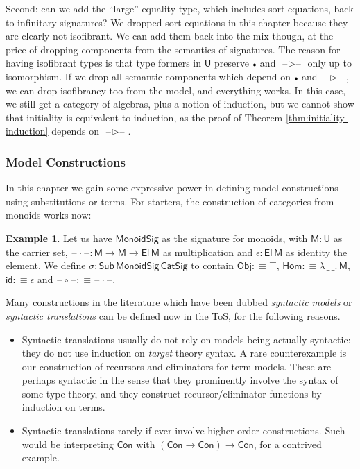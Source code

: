 \documentclass[12pt,a4paper,twoside,openany]{book}
\theoremstyle{remark}
\theoremstyle{definition}
\newtheorem{myexample}{Example}
\theoremstyle{theorem}
\newcommand{\ms}[1]{\mathsf{#1}}
\newcommand{\id}{\mathsf{id}}
\newcommand{\Con}{\mathsf{Con}}
\newcommand{\Sub}{\mathsf{Sub}}
\newcommand{\U}{\mathsf{U}}
\newcommand{\El}{\mathsf{El}}
\newcommand{\blank}{\mathord{\hspace{1pt}\text{--}\hspace{1pt}}}
\newcommand{\ext}{\triangleright}
\newcommand{\emptycon}{\scaleobj{.75}\bullet}
\newcommand{\defn}{:\equiv}
\begin{document}
Second: can we add the ``large'' equality type, which includes sort equations,
back to infinitary signatures? We dropped sort equations in this chapter because
they are clearly not isofibrant. We can add them back into the mix though, at
the price of dropping components from the semantics of signatures. The reason for
having isofibrant types is that type formers in $\U$ preserve $\emptycon$ and
$\blank\!\ext\!\blank$ only up to isomorphism. If we drop all semantic
components which depend on $\emptycon$ and $\blank\!\ext\!\blank$, we can drop
isofibrancy too from the model, and everything works. In this case, we still get
a category of algebras, plus a notion of induction, but we cannot show that
initiality is equivalent to induction, as the proof of Theorem
\ref{thm:initiality-induction} depends on $\blank\!\ext\!\blank$.

\subsubsection{Model Constructions}

In this chapter we gain some expressive power in defining model constructions
using substitutions or terms. For starters, the construction of categories from
monoids works now:

\begin{myexample}
Let us have
$\ms{MonoidSig}$ as the signature for monoids, with $\ms{M} : \U$ as the carrier
set, $\blank\!\cdot\!\blank : \ms{M} \to \ms{M} \to \El\,\ms{M}$ as
multiplication and $\epsilon : \El\,\ms{M}$ as identity the element. We define
$\sigma : \Sub\,\ms{MonoidSig}\,\ms{CatSig}$ to contain $\ms{Obj} \defn \top$,
$\ms{Hom} \defn \lambda\,\_\,\_.\,\ms{M}$, $\id \defn \epsilon$ and
$\blank\!\circ\!\blank \defn \blank\!\cdot\!\blank$.
\end{myexample}

Many constructions in the literature which have been dubbed \emph{syntactic
models} \cite{next700} or \emph{syntactic translations} can be defined now in
the ToS, for the following reasons.
\begin{itemize}
\item
  Syntactic translations usually do not rely on models being actually syntactic:
  they do not use induction on \emph{target} theory syntax. A rare
  counterexample is our construction of recursors and eliminators for term
  models. These are perhaps syntactic in the sense that they prominently involve
  the syntax of some type theory, and they construct recursor/eliminator
  functions by induction on terms.
\item
  Syntactic translations rarely if ever involve higher-order constructions.
  Such would be interpreting $\Con$ with $(\Con \to \Con) \to \Con$, for a
  contrived example.
\end{itemize}
\end{document}
